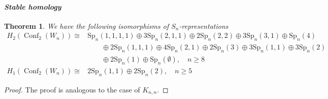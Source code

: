 \documentclass[12pt]{amsart}
\newtheorem{thm}{Theorem}[section]
\theoremstyle{definition}
\newcommand{\conf}{\operatorname{Conf}}
\begin{document}
\paragraph{\textit{Stable homology}}
\begin{thm}\label{thm: ordered crown}
We have the following isomorphisms of $S_n$-representations
\begin{align*}
H_2(\conf_2(W_n)) \cong &\mathrm{Sp}_n(1,1,1,1)\oplus 3\mathrm{Sp}_n(2,1,1) \oplus 2\mathrm{Sp}_n(2,2) \oplus 3\mathrm{Sp}_n(3,1) \oplus \mathrm{Sp}_n(4) \\
&\qquad \oplus 2\mathrm{Sp}_n(1,1,1) \oplus 4\mathrm{Sp}_n(2,1) \oplus 2\mathrm{Sp}_n(3) \oplus 3\mathrm{Sp}_n(1,1) \oplus 3\mathrm{Sp}_n(2) \\
&\qquad \oplus 2\mathrm{Sp}_n(1) \oplus \mathrm{Sp}_n(\emptyset),\quad n\geq 8\\
H_1(\conf_2(W_n))\cong & 2\mathrm{Sp}_n(1, 1) \oplus 2\mathrm{Sp}_n(2),\quad n\geq 5
\end{align*}
\end{thm}
\begin{proof}
    The proof is analogous to the case of $K_{n,n}$.
\end{proof}
\end{document}
